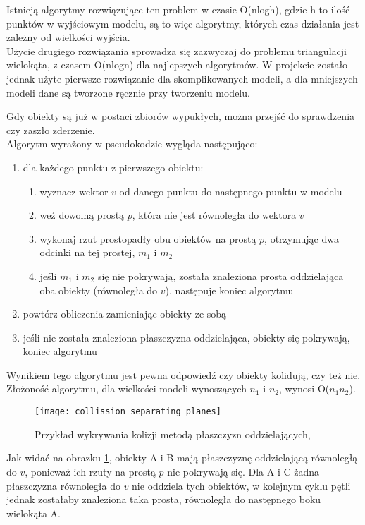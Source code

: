 Istnieją algorytmy rozwiązujące ten problem w czasie O(nlogh), gdzie h to ilo\'sć punktów w wyj\'sciowym modelu, są to więc algorytmy, których czas działania jest zależny od wielko\'sci wyj\'scia.\bigskip\\

Użycie drugiego rozwiązania sprowadza się zazwyczaj do problemu triangulacji wielokąta, z czasem O(nlogn) dla najlepszych algorytmów. W projekcie zostało jednak użyte pierwsze rozwiązanie dla skomplikowanych modeli, a dla mniejszych modeli dane są tworzone ręcznie przy tworzeniu modelu.\\

\smallskip

\noindent Gdy obiekty są już w postaci zbiorów wypukłych, można przej\'sć do sprawdzenia czy zaszło zderzenie.\\
Algorytm wyrażony w pseudokodzie wygląda następująco:\begin{enumerate}
	\item dla każdego punktu z pierwszego obiektu:\begin{enumerate}
		\item wyznacz wektor $v$ od danego punktu do następnego punktu w modelu
		\item weź dowolną prostą $p$, która nie jest równoległa do wektora $v$
		\item wykonaj rzut prostopadły obu obiektów na prostą $p$, otrzymując dwa odcinki na tej prostej, $m_1$ i $m_2$
		\item je\'sli $m_1$ i $m_2$ się nie pokrywają, została znaleziona prosta oddzielająca oba obiekty (równoległa do $v$), następuje koniec algorytmu
	\end{enumerate}
	\item powtórz obliczenia zamieniając obiekty ze sobą
	\item je\'sli nie została znaleziona płaszczyzna oddzielająca, obiekty się pokrywają, koniec algorytmu
\end{enumerate}\bigskip

\noindent Wynikiem tego algorytmu jest pewna odpowiedź czy obiekty kolidują, czy też nie.\\
Złożono\'sć algorytmu, dla wielko\'sci modeli wynoszących $n_1$ i $n_2$, wynosi O($n_1$$n_2$).\newpage

\begin{figure}[h]
	\centering
	\noindent\texttt{[image: collission\_separating\_planes]}
	\caption{Przykład wykrywania kolizji metodą płaszczyzn oddzielających, }
	\label{separating_planes}
\end{figure}

Jak widać na obrazku \ref{separating_planes}, obiekty A i B mają płaszczyznę oddzielającą równoległą do $v$, ponieważ ich rzuty na prostą $p$ nie pokrywają się. Dla A i C żadna płaszczyzna równoległa do $v$ nie oddziela tych obiektów, w kolejnym cyklu pętli jednak zostałaby znaleziona taka prosta, równoległa do następnego boku wielokąta A.
